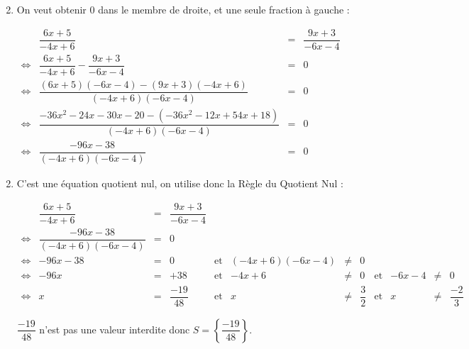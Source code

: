 \documentclass[15pt, mathserif]{beamer}
\begin{document}
 \begin{frame} 
 \begin{enumerate} \setcounter{enumi}{1}  
 	 \item On veut obtenir $0$ dans le membre de droite, et une seule fraction à gauche : 
 
 	 $\begin{array}{crcl} 
 	 	 & \dfrac{6x+5}{-4x+6} & = &\dfrac{9x+3}{-6x-4} \\ 
 	 \Leftrightarrow & \dfrac{6x+5}{-4x+6}-\dfrac{9x+3}{-6x-4} & = & 0 \\ 
 
 \Leftrightarrow & \dfrac{(6x+5)(-6x-4)-(9x+3)(-4x+6)}{(-4x+6)(-6x-4)} & = & 0 \\ \Leftrightarrow & \dfrac{-36x^2-24x-30x-20-(-36x^2-12x+54x+18)}{(-4x+6)(-6x-4)}& = & 0 \\ \Leftrightarrow & \dfrac{-96x-38}{(-4x+6)(-6x-4)} & = & 0 
 	 \end{array}$ 
 \end{enumerate} 
 \end{frame} 
 \begin{frame} 
 \begin{enumerate} \setcounter{enumi}{1}  
 	 \item C'est une équation quotient nul, on utilise donc la Règle du Quotient Nul :
 
  \tiny{$\begin{array}{crclcrclcrcl} 
 
 	  & \dfrac{6x+5}{-4x+6} & = &\dfrac{9x+3}{-6x-4} & & & & & & & & \\ 
 	 \Leftrightarrow & \dfrac{-96x-38}{(-4x+6)(-6x-4)} & = & 0 & & & & & & & & \\ 
 	 \Leftrightarrow & -96x-38 & =& 0 & \text{et} & (-4x+6)(-6x-4) & \neq & 0 \\ 
 	 \Leftrightarrow & -96x&=&+38& \text{et} & -4x+6& \neq & 0 & \text{et} & -6x-4& \neq & 0 \\ 
 	 \Leftrightarrow & x&=&\dfrac{-19}{48} & \text{et} & x &\neq&\dfrac{3}{2} & \text{et} & x & \neq&\dfrac{-2}{3}
 
 \end{array}$} 
 
 \bigskip 
 
 \normalsize{ $ \dfrac{-19}{48} $ n'est pas une valeur interdite donc $S=\left\{ \dfrac{-19}{48}\right\}$.} 
 
 \end{enumerate} \end{frame}
\end{document}
